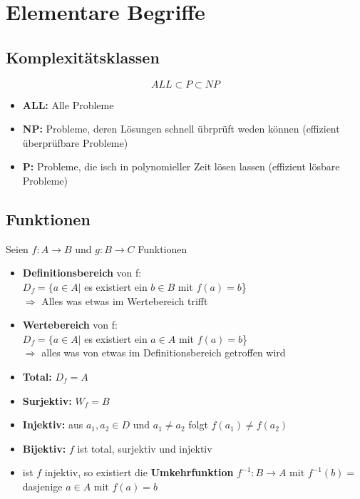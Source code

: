 \documentclass[14pt]{article}
\begin{document}
    \section{Elementare Begriffe}

        \subsection{Komplexitätsklassen}
        \[
            ALL \subset P \subset NP
        \]
        \begin{itemize}
            \item \textbf{ALL:} Alle Probleme
            \item \textbf{NP:} Probleme, deren Lösungen schnell übrprüft weden können
                (effizient überprüfbare Probleme)
            \item \textbf{P:} Probleme, die isch in polynomieller Zeit lösen lassen 
                (effizient lösbare Probleme)
        \end{itemize}

        \subsection{Funktionen}
        \begin{definition}[Funktionen]
            Seien $f: A \rightarrow B$ und $g : B \rightarrow C$ Funktionen
            \begin{itemize}
                \item \textbf{Definitionsbereich} von f: \\
                $D_f = \{a \in A |$ es existiert ein $ b \in B$ mit $f(a) = b$\} \\
                $\Rightarrow$ Alles was etwas im Wertebereich trifft
                \item \textbf{Wertebereich} von f: \\
                $D_f = \{a \in A |$ es existiert ein $ a \in A$ mit $f(a) = b$\} \\
                $\Rightarrow$ alles was von etwas im Definitionsbereich 
                getroffen wird
                \item \textbf{Total:} $D_f = A$
                \item \textbf{Surjektiv:} $W_f = B$
                \item \textbf{Injektiv:} aus $a_1, a_2 \in D$ und $a_1 \neq a_2$
                folgt $f(a_1) \neq f(a_2)$
                \item \textbf{Bijektiv:} $f$ ist total, surjektiv und injektiv
                \item ist $f$ injektiv, so existiert die \textbf{Umkehrfunktion}
                $f^{-1}: B \rightarrow A$ mit $f^{-1}(b) = $ dasjenige $a  \in A$
                mit $f(a) = b$
            \end{itemize}
        \end{definition}
\end{document}
